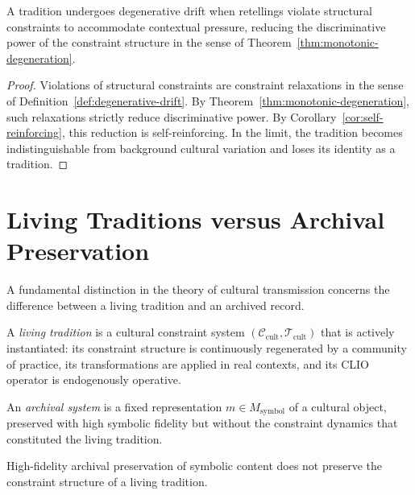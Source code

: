 \documentclass[11pt,openany]{book}
\begin{document}
\begin{proposition}
\label{prop:fragmentation-degenerative}
A tradition undergoes degenerative drift when retellings
violate structural constraints to accommodate contextual
pressure, reducing the discriminative power of the
constraint structure in the sense of
Theorem~\ref{thm:monotonic-degeneration}.
\end{proposition}

\begin{proof}
Violations of structural constraints are constraint
relaxations in the sense of
Definition~\ref{def:degenerative-drift}.  By
Theorem~\ref{thm:monotonic-degeneration}, such relaxations
strictly reduce discriminative power.  By
Corollary~\ref{cor:self-reinforcing}, this reduction is
self-reinforcing.  In the limit, the tradition becomes
indistinguishable from background cultural variation and
loses its identity as a tradition.
\end{proof}

\section{Living Traditions versus Archival Preservation}
\label{sec:living-vs-archival}

A fundamental distinction in the theory of cultural
transmission concerns the difference between a living
tradition and an archived record.

\begin{definition}
\label{def:living-tradition}
A \emph{living tradition} is a cultural constraint system
$(\mathcal{C}_{\mathrm{cult}}, \mathcal{T}_{\mathrm{cult}})$
that is actively instantiated: its constraint structure is
continuously regenerated by a community of practice, its
transformations are applied in real contexts, and its CLIO
operator is endogenously operative.
\end{definition}

\begin{definition}
\label{def:archival}
An \emph{archival system} is a fixed representation
$m \in M_{\mathrm{symbol}}$ of a cultural object, preserved
with high symbolic fidelity but without the constraint
dynamics that constituted the living tradition.
\end{definition}

\begin{proposition}
\label{prop:archiving}
High-fidelity archival preservation of symbolic content
does not preserve the constraint structure of a living
tradition.
\end{proposition}
\end{document}
